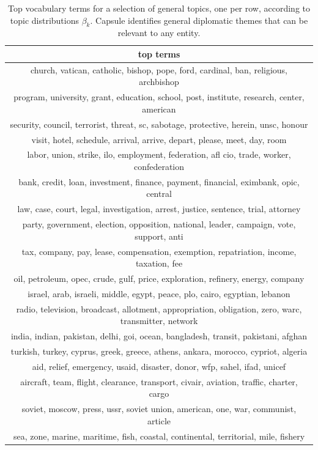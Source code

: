\begin{table}
\centering
\small
\begin{tabular}{c}
\toprule
\textbf{top terms} \\
\midrule
church, vatican, catholic, bishop, pope, ford, cardinal, ban, religious, archbishop \\
program, university, grant, education, school, post, institute, research, center, american \\
security, council, terrorist, threat, sc, sabotage, protective, herein, unsc, honour \\
visit, hotel, schedule, arrival, arrive, depart, please, meet, day, room \\
labor, union, strike, ilo, employment, federation, afl cio, trade, worker, confederation \\
bank, credit, loan, investment, finance, payment, financial, eximbank, opic, central \\
law, case, court, legal, investigation, arrest, justice, sentence, trial, attorney \\
party, government, election, opposition, national, leader, campaign, vote, support, anti \\
tax, company, pay, lease, compensation, exemption, repatriation, income, taxation, fee \\
oil, petroleum, opec, crude, gulf, price, exploration, refinery, energy, company \\
israel, arab, israeli, middle, egypt, peace, plo, cairo, egyptian, lebanon \\
radio, television, broadcast, allotment, appropriation, obligation, zero, warc, transmitter, network \\
india, indian, pakistan, delhi, goi, ocean, bangladesh, transit, pakistani, afghan \\
turkish, turkey, cyprus, greek, greece, athens, ankara, morocco, cypriot, algeria \\
aid, relief, emergency, usaid, disaster, donor, wfp, sahel, ifad, unicef \\
aircraft, team, flight, clearance, transport, civair, aviation, traffic, charter, cargo \\
soviet, moscow, press, ussr, soviet union, american, one, war, communist, article \\
sea, zone, marine, maritime, fish, coastal, continental, territorial, mile, fishery \\
\bottomrule
\end{tabular}
\caption{Top vocabulary terms for a selection of general topics, one per row, according to topic distributions $\beta_k$.  Capsule identifies general diplomatic themes that can be relevant to any entity.}
\label{tab:topics}
\end{table}

